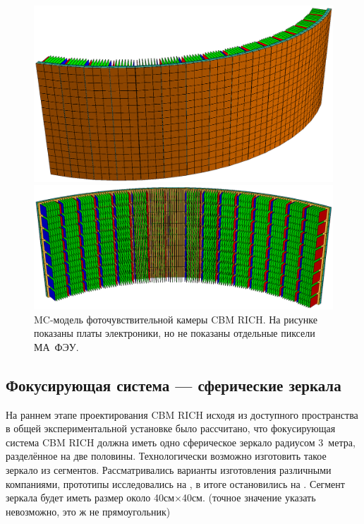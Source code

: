\begin{figure}[H]
\begin{minipage}[b]{0.495\textwidth}
\includegraphics[width=1.0\textwidth]{pictures/Camera_pmts.png}
\end{minipage}
\hspace{0.01\textwidth}
\begin{minipage}[b]{0.495\textwidth}
\includegraphics[width=1.0\textwidth]{pictures/Camera_back.png}
\end{minipage}
\caption{MC-модель фоточувствительной камеры CBM RICH. На рисунке показаны платы электроники, но не показаны отдельные пиксели МА~ФЭУ.}
\label{fig:geoMCcamera}
\end{figure}

\subsection{Фокусирующая система --- сферические зеркала}\label{sec:RICHgeoMirror}

На раннем этапе проектирования CBM RICH исходя из доступного пространства в общей экспериментальной установке было рассчитано, что фокусирующая система CBM RICH должна иметь одно сферическое зеркало радиусом 3~метра, разделённое на две половины.
Технологически возможно изготовить такое зеркало из сегментов. Рассматривались варианты изготовления различными компаниями, прототипы исследовались на \todo, в итоге остановились на \todo.
Сегмент зеркала будет иметь размер около 40см$\times$40см. (точное значение указать невозможно, это ж не прямоугольник)


